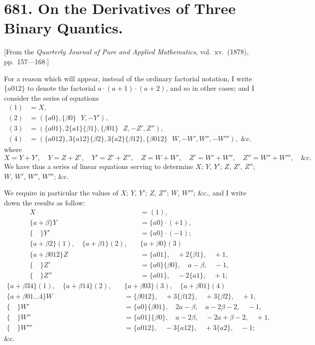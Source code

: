 \documentclass[11pt,a4paper]{book}
\begin{document}
\newpage

\section*{681. On the Derivatives of Three Binary Quantics.}

[From the \textit{Quarterly Journal of Pure and Applied Mathematics}, vol.\ xv.\ (1878), pp.\ 157---168.]

For a reason which will appear, instead of the ordinary factorial notation, I write $\{a012\}$ to denote the factorial $a \cdot (a+1) \cdot (a+2)$, and so in other cases; and I consider the series of equations
\begin{align*}
(1) &= X, \\
(2) &= (\{a0\}, \{\beta0\} \,\,\,\, Y, -Y'), \\
(3) &= (\{a01\}, 2\{a1\}\{\beta1\}, \{\beta01\} \,\,\,\, Z, -Z', Z''), \\
(4) &= (\{a012\}, 3\{a12\}\{\beta2\}, 3\{a2\}\{\beta12\}, \{\beta012\} \,\,\,\, W, -W', W'', -W'''), \text{ \&c.}
\end{align*}
where
\[
X = Y + Y', \quad Y = Z + Z', \quad Y' = Z' + Z'', \quad Z = W + W', \quad Z' = W' + W'', \quad Z'' = W'' + W''', \quad \text{\&c.}
\]
We have thus a series of linear equations serving to determine $X$; $Y$, $Y'$; $Z$, $Z'$, $Z''$; $W$, $W'$, $W''$, $W'''$; \&c.

We require in particular the values of $X$; $Y$, $Y'$; $Z$, $Z''$; $W$, $W'''$; \&c., and I write down the results as follow:
\begin{align*}
X &= (1), \\
\{a + \beta\}Y &= \{a0\} \cdot (+1), \\
\{ \quad \}Y' &= \{a0\} \cdot (-1); \\
\{a + \beta 2\}(1), \quad \{a + \beta 1\}(2), \quad &\{a + \beta 0\}(3) \\
\{a + \beta 012\}Z &= \{a01\}, \quad +2\{\beta 1\}, \quad +1, \\
\{ \quad \}Z' &= \{a0\}\{\beta0\}, \quad a - \beta, \quad -1, \\
\{ \quad \}Z'' &= \{a01\}, \quad -2\{a1\}, \quad +1;
\end{align*}
\begin{align*}
\{a + \beta 34\}(1), \quad \{a + \beta 14\}(2), \quad &\{a + \beta 03\}(3), \quad \{a + \beta 01\}(4) \\
\{a + \beta 01 \ldots 4\}W &= \{\beta 012\}, \quad +3\{\beta 12\}, \quad +3\{\beta 2\}, \quad +1, \\
\{ \quad \}W' &= \{a0\}\{\beta 01\}, \quad 2a - \beta, \quad a - 2\beta - 2, \quad -1, \\
\{ \quad \}W'' &= \{a01\}\{\beta 0\}, \quad a - 2\beta, \quad -2a + \beta - 2, \quad +1, \\
\{ \quad \}W''' &= \{a012\}, \quad -3\{a12\}, \quad +3\{a2\}, \quad -1;
\end{align*}
\&c.
\end{document}
